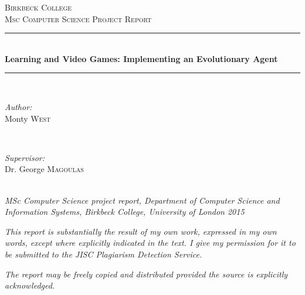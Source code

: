 \documentclass[a4paper, 11pt]{article}
\begin{document}
\begin{titlepage}
\newcommand{\HRule}{\rule{\linewidth}{0.5mm}}
\center

\textsc{\LARGE Birkbeck College}\\[1.5cm] %

\textsc{\Large Msc Computer Science Project Report}

\HRule \\[0.4cm]
{ \LARGE \bfseries Learning and Video Games: Implementing an Evolutionary Agent}\\[0.4cm] %
\HRule \\[1.5cm]


\begin{minipage}{0.4\textwidth}
\begin{flushleft} \large
\emph{Author:}\\
Monty \textsc{West} %
\end{flushleft}
\end{minipage}
~
\begin{minipage}{0.4\textwidth}
\begin{flushright} \large
\emph{Supervisor:} \\
Dr. George \textsc{Magoulas} %
\end{flushright}
\end{minipage}\\[4cm]

\emph{MSc Computer Science project report, Department of
Computer Science and Information Systems, Birkbeck College,
University of London 2015}

\vspace{5mm}

\emph{This report is substantially the result of my own work,
expressed in my own words, except where explicitly indicated in
the text. I give my permission for it to be submitted to the
JISC Plagiarism Detection Service.}

\vspace{5mm}

\emph{The report may be freely copied and distributed provided the
source is explicitly acknowledged.}

\end{titlepage}

\end{document}

